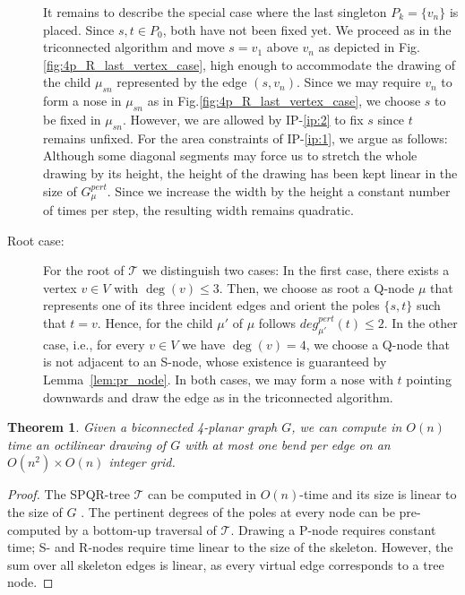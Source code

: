 \documentclass[a4paper,twoside,11pt]{article}
\newtheorem{theorem}{Theorem}
\newcommand{\pert}[1]{G^\textit{pert}_{#1}}
\newcommand{\pdeg}[2]{\textit{deg}^{\textit{pert}}_{#1}(#2)}
\newcommand{\IPGeo}{IP-\ref{ip:1}\xspace}
\newcommand{\IPFix}{IP-\ref{ip:2}\xspace}
\begin{document}
\begin{description}
It remains to describe the special case where the last singleton
$P_k = \{ v_n \}$ is placed. Since $s,t \in P_0$, both have not been
fixed yet. We proceed as in the triconnected algorithm and move $s =
v_1$ above $v_n$ as depicted in Fig.\ref{fig:4p_R_last_vertex_case},
high enough to accommodate the drawing of the child $\mu_{sn}$
represented by the edge $(s, v_n)$. Since we may require $v_n$ to
form a nose in $\mu_{sn}$ as in Fig.\ref{fig:4p_R_last_vertex_case},
we choose $s$ to be fixed in $\mu_{sn}$. However, we are allowed by
\IPFix to fix $s$ since $t$ remains unfixed. For the area
constraints of \IPGeo, we argue as follows: Although some diagonal
segments may force us to stretch the whole drawing by its height,
the height of the drawing has been kept linear in the size of
$\pert{\mu}$. Since we increase the width by the height a constant
number of times per step, the resulting width remains quadratic.
\item[Root case:] For the root of $\mathcal{T}$ we distinguish two cases:
In the first case, there exists a vertex $v \in V$ with $\deg(v)
\leq 3$. Then, we choose as root a Q-node $\mu$ that represents one
of its three incident edges and orient the poles $\{s,t\}$ such that
$t = v$. Hence, for the child $\mu'$ of $\mu$ follows
$\pdeg{\mu'}{t} \leq 2$. In the other case, i.e., for every $v \in
V$ we have $\deg(v) = 4$, we choose a Q-node that is not adjacent to
an S-node, whose existence is guaranteed by Lemma~\ref{lem:pr_node}.
In both cases, we may form a nose with $t$ pointing downwards and
draw the edge as in the triconnected algorithm.
\end{description}

\begin{theorem}
Given a biconnected 4-planar graph $G$, we can compute in $O(n)$
time an octilinear drawing of $G$ with at most one bend per edge on
an $O(n^2) \times O(n)$ integer grid.
\end{theorem}
\begin{proof}
The SPQR-tree $\mathcal{T}$ can be computed in $O(n)$-time and its
size is linear to the size of $G$ \cite{GM00}. The pertinent degrees
of the poles at every node can be pre-computed by a bottom-up
traversal of $\mathcal{T}$. Drawing a P-node requires constant time;
S- and R-nodes require time linear to the size of the skeleton.
However, the sum over all skeleton edges is linear, as every virtual
edge corresponds to a tree node.
\end{proof}
\end{document}
